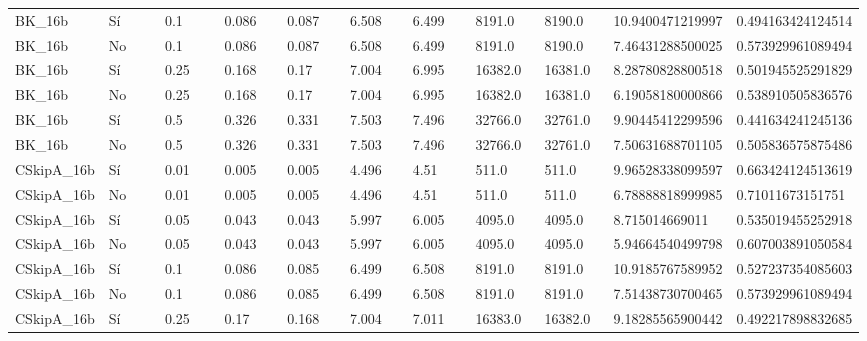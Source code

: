 {{\begin{longtable}{M{0.09\linewidth}M{0.09\linewidth}M{0.09\linewidth}M{0.09\linewidth}M{0.09\linewidth}M{0.09\linewidth}M{0.09\linewidth}M{0.09\linewidth}M{0.09\linewidth}M{0.09\linewidth}M{0.09\linewidth}}
BK\_16b & Sí & \num{0.1} & \num{0.086} & \num{0.087} & \num{6.508} & \num{6.499} & \num{8191.0} & \num{8190.0} & \num{10.9400471219997} & \num{0.494163424124514} \\
BK\_16b & No & \num{0.1} & \num{0.086} & \num{0.087} & \num{6.508} & \num{6.499} & \num{8191.0} & \num{8190.0} & \num{7.46431288500025} & \num{0.573929961089494} \\
BK\_16b & Sí & \num{0.25} & \num{0.168} & \num{0.17} & \num{7.004} & \num{6.995} & \num{16382.0} & \num{16381.0} & \num{8.28780828800518} & \num{0.501945525291829} \\
BK\_16b & No & \num{0.25} & \num{0.168} & \num{0.17} & \num{7.004} & \num{6.995} & \num{16382.0} & \num{16381.0} & \num{6.19058180000866} & \num{0.538910505836576} \\
BK\_16b & Sí & \num{0.5} & \num{0.326} & \num{0.331} & \num{7.503} & \num{7.496} & \num{32766.0} & \num{32761.0} & \num{9.90445412299596} & \num{0.441634241245136} \\
BK\_16b & No & \num{0.5} & \num{0.326} & \num{0.331} & \num{7.503} & \num{7.496} & \num{32766.0} & \num{32761.0} & \num{7.50631688701105} & \num{0.505836575875486} \\
CSkipA\_16b & Sí & \num{0.01} & \num{0.005} & \num{0.005} & \num{4.496} & \num{4.51} & \num{511.0} & \num{511.0} & \num{9.96528338099597} & \num{0.663424124513619} \\
CSkipA\_16b & No & \num{0.01} & \num{0.005} & \num{0.005} & \num{4.496} & \num{4.51} & \num{511.0} & \num{511.0} & \num{6.78888818999985} & \num{0.71011673151751} \\
CSkipA\_16b & Sí & \num{0.05} & \num{0.043} & \num{0.043} & \num{5.997} & \num{6.005} & \num{4095.0} & \num{4095.0} & \num{8.715014669011} & \num{0.535019455252918} \\
CSkipA\_16b & No & \num{0.05} & \num{0.043} & \num{0.043} & \num{5.997} & \num{6.005} & \num{4095.0} & \num{4095.0} & \num{5.94664540499798} & \num{0.607003891050584} \\
CSkipA\_16b & Sí & \num{0.1} & \num{0.086} & \num{0.085} & \num{6.499} & \num{6.508} & \num{8191.0} & \num{8191.0} & \num{10.9185767589952} & \num{0.527237354085603} \\
CSkipA\_16b & No & \num{0.1} & \num{0.086} & \num{0.085} & \num{6.499} & \num{6.508} & \num{8191.0} & \num{8191.0} & \num{7.51438730700465} & \num{0.573929961089494} \\
CSkipA\_16b & Sí & \num{0.25} & \num{0.17} & \num{0.168} & \num{7.004} & \num{7.011} & \num{16383.0} & \num{16382.0} & \num{9.18285565900442} & \num{0.492217898832685} \\

\end{longtable}}}
